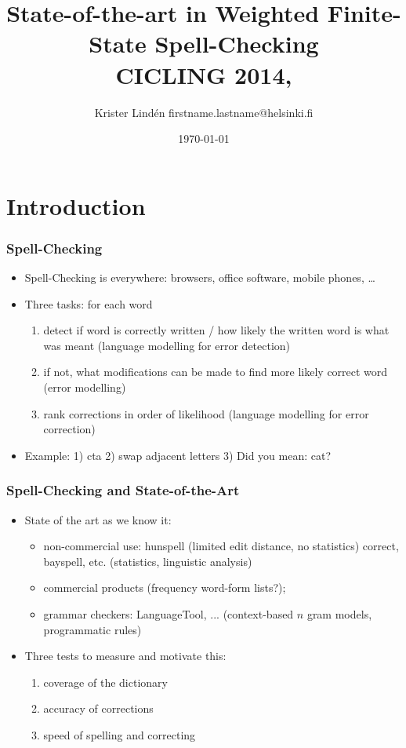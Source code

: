 \documentclass[t,12pt]{beamer}
\title{State-of-the-art in Weighted Finite-State Spell-Checking\\
\scriptsize{CICLING 2014, \devanagarifont{काठमाडौं}}}
\author{\fuuuuu{Tommi A Pirinen} \and Krister Lindén
\scriptsize \guilsinglleft{}firstname.lastname@helsinki.fi\guilsinglright{}}
\institute{University of Helsinki\\Department of Modern Languages}
\date{\today}
\begin{document}

\HyTitle


\section{Introduction}

       
\begin{frame}
    \frametitle{Spell-Checking}
    \begin{itemize}
        \item Spell-Checking is everywhere: browsers, office software, mobile
            phones, \ldots
        \item Three tasks: for each word \begin{enumerate}
                \item detect if word is correctly written / how likely the
                    written word is what was meant (language modelling
                    for error detection)
                \item if not, what modifications can be made to find more
                    likely correct word (error modelling)
                \item rank corrections in order of likelihood
                    (language modelling for error correction)
            \end{enumerate}
        \item Example: 1) cta 2) swap adjacent letters 3) Did you mean: cat?
    \end{itemize}
\end{frame}

\begin{frame}
    \frametitle{Spell-Checking and State-of-the-Art}
    \begin{itemize}
        \item State of the art as we know it: \begin{itemize}
                \item non-commercial use: hunspell (limited edit distance, no statistics)
                     correct, bayspell, etc. (statistics, linguistic analysis)
                \item commercial products (frequency word-form lists?);
                \item grammar checkers: LanguageTool, ... (context-based \(n\) gram
            models, programmatic rules)
    \end{itemize}
        \item Three tests to measure and motivate this: \begin{enumerate}
                \item coverage of the dictionary
                \item accuracy of corrections
                \item speed of spelling and correcting
            \end{enumerate}
    \end{itemize}
\end{frame}
\end{document}

